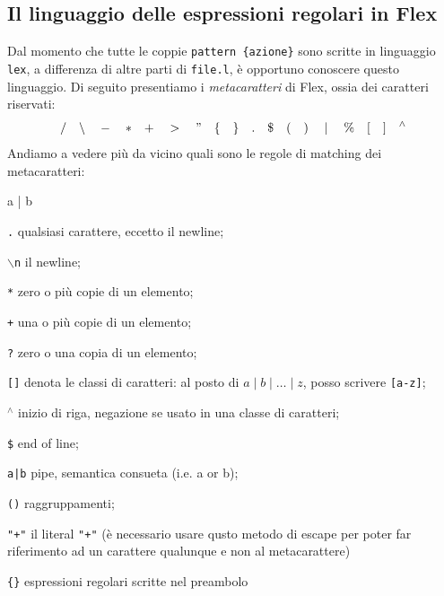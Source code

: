 \documentclass[class=book, crop=false, oneside, 12pt]{standalone}
\begin{document}
\subsection{Il linguaggio delle espressioni regolari in Flex}
Dal momento che tutte le coppie \texttt{pattern \{azione\}} sono scritte in linguaggio \texttt{lex}, a differenza di altre parti di \texttt{file.l}, è opportuno conoscere questo linguaggio. Di seguito presentiamo i \emph{metacaratteri} di Flex, ossia dei caratteri riservati:
\begin{equation*}
    \slash \quad \backslash \quad - \quad * \quad + \quad >\quad " \quad \{ \quad \} \quad . \quad \$ \quad ( \quad ) \quad \mid \quad \% \quad [ \quad ] \quad ^\wedge
\end{equation*}
\noindent Andiamo a vedere più da vicino quali sono le regole di matching dei metacaratteri:
\begin{labeling}{a | b}
    \item[\texttt{.}] qualsiasi carattere, eccetto il newline;
    \item[\texttt{\(\backslash\)n}] il newline;
    \item[\texttt{*}] zero o più copie di un elemento;
    \item[\texttt{+}] una o più copie di un elemento;
    \item[\texttt{?}] zero o una copia di un elemento;
    \item[\texttt{[]}] denota le classi di caratteri: al posto di \(a \mid b \mid \ldots \mid z\), posso scrivere \texttt{[a-z]};
    \item[\texttt{\(^\wedge\)}] inizio di riga, negazione se usato in una classe di caratteri;
    \item[\texttt{\$}] end of line;
    \item[\texttt{a|b}] pipe, semantica consueta  (i.e. a or b);
    \item[\texttt{()}] raggruppamenti;
    \item[\texttt{"+"}] il literal \texttt{"+"} (è necessario usare qusto metodo di escape per poter far riferimento ad un carattere qualunque e non al metacarattere)
    \item[\texttt{\{\}}] espressioni regolari scritte nel preambolo
\end{labeling}
\end{document}
